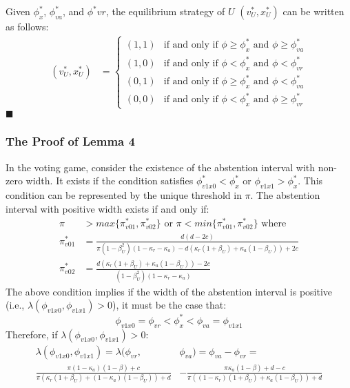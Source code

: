 \par Given $\phi^*_x$, $\phi^*_{va}$, and $\phi^*{vr}$, the equilibrium strategy of $U$ $(v^*_U,x^*_U)$ can be written as follows: 
\begin{align*}
(v^*_U, x^*_U) &= 
\begin{cases}
(1, 1) & \text{if and only if $\phi \geq \phi^*_x$ and $\phi \geq \phi^*_{va}$}\\
(1, 0) & \text{if and only if $\phi < \phi^*_x$ and $\phi < \phi^*_{vr}$}\\
(0, 1) & \text{if and only if $\phi \geq \phi^*_x$ and $\phi < \phi^*_{va}$}\\
(0, 0) & \text{if and only if $\phi < \phi^*_x$ and $\phi \geq \phi^*_{vr}$}
\end{cases}
\end{align*}
\hfill $\blacksquare$

\subsubsection{The Proof of Lemma 4}

\par In the voting game, consider the existence of the abstention interval with non-zero width. It exists if the condition satisfies $\phi^*_{v1x0} < \phi^*_x$ or $\phi_{v1x1} > \phi^*_x$. This condition can be represented by the unique threshold in $\pi$. The abstention interval with positive width exists if and only if:
\begin{align*}
\pi &> max \{\pi^*_{v01}, \pi^*_{v02}\}  \text{ or } \pi < min \{\pi^*_{v01}, \pi^*_{v02} \}  \text{ where } \\
\pi^*_{v01} &= \frac{d( d - 2c ) }{\pi (1 - \beta_U^2) (1- \kappa_{r} - \kappa_{a}) - d ( \kappa_{r} (1 + \beta_U) + \kappa_{a} (1-\beta_U )) + 2c}  \\ 
\pi^*_{v02} &= \frac{d (\kappa_{r}(1 + \beta_U) + \kappa_{a} (1-\beta_U)) - 2c}{(1 -\beta_U^2)(1-\kappa_{r}-\kappa_{a})} 
\end{align*}
\noindent The above condition implies if the width of the abstention interval is positive (i.e., $\lambda(\phi_{v1x0},\phi_{v1x1})>0$), it must be the case that:
$$\phi_{v1x0}=\phi_{vr}<\phi^*_x<\phi_{va}=\phi_{v1x1}$$
\noindent Therefore, if $\lambda(\phi_{v1x0},\phi_{v1x1})>0$:
\begin{align*}
\lambda(\phi_{v1x0},\phi_{v1x1}) = \lambda(\phi_{vr},&\phi_{va}) = \phi_{va}-\phi_{vr}= \\ 
\frac{\pi (1- \kappa_{a}) (1-\beta) + c}{\pi (\kappa_{r} (1+\beta_U) + (1 - \kappa_{a}) (1-\beta_U)) + d} &- \frac{\pi \kappa_{a} (1-\beta) + d - c}{\pi ( (1-\kappa_{r}) (1+\beta_U) + \kappa_{a} (1-\beta_U)) + d} \\
\end{align*}

